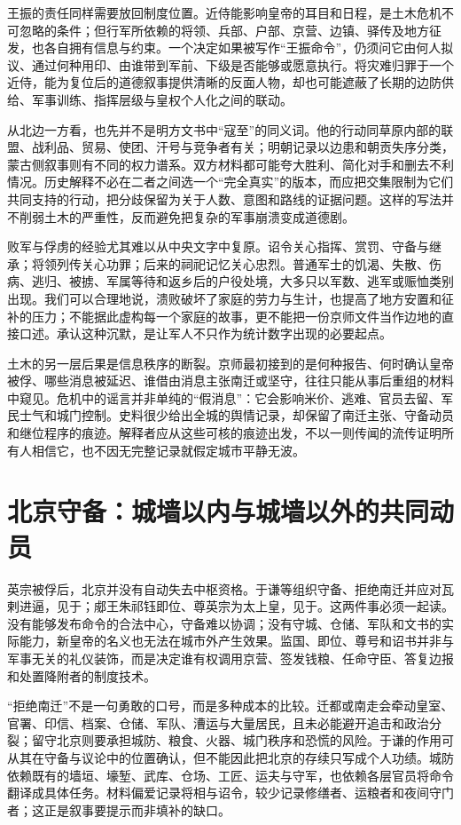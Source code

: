 王振的责任同样需要放回制度位置。近侍能影响皇帝的耳目和日程，是土木危机不可忽略的条件；但行军所依赖的将领、兵部、户部、京营、边镇、驿传及地方征发，也各自拥有信息与约束。一个决定如果被写作“王振命令”，仍须问它由何人拟议、通过何种用印、由谁带到军前、下级是否能够或愿意执行。将灾难归罪于一个近侍，能为复位后的道德叙事提供清晰的反面人物，却也可能遮蔽了长期的边防供给、军事训练、指挥层级与皇权个人化之间的联动。

从北边一方看，也先并不是明方文书中“寇至”的同义词。他的行动同草原内部的联盟、战利品、贸易、使团、汗号与竞争者有关；明朝记录以边患和朝贡失序分类，蒙古侧叙事则有不同的权力谱系。双方材料都可能夸大胜利、简化对手和删去不利情况。历史解释不必在二者之间选一个“完全真实”的版本，而应把交集限制为它们共同支持的行动，把分歧保留为关于人数、意图和路线的证据问题。这样的写法并不削弱土木的严重性，反而避免把复杂的军事崩溃变成道德剧。

败军与俘虏的经验尤其难以从中央文字中复原。诏令关心指挥、赏罚、守备与继承；将领列传关心功罪；后来的祠祀记忆关心忠烈。普通军士的饥渴、失散、伤病、逃归、被掳、军属等待和返乡后的户役处境，大多只以军数、逃军或赈恤类别出现。我们可以合理地说，溃败破坏了家庭的劳力与生计，也提高了地方安置和征补的压力；不能据此虚构每一个家庭的故事，更不能把一份京师文件当作边地的直接口述。承认这种沉默，是让军人不只作为统计数字出现的必要起点。

土木的另一层后果是信息秩序的断裂。京师最初接到的是何种报告、何时确认皇帝被俘、哪些消息被延迟、谁借由消息主张南迁或坚守，往往只能从事后重组的材料中窥见。危机中的谣言并非单纯的“假消息”：它会影响米价、逃难、官员去留、军民士气和城门控制。史料很少给出全城的舆情记录，却保留了南迁主张、守备动员和继位程序的痕迹。解释者应从这些可核的痕迹出发，不以一则传闻的流传证明所有人相信它，也不因无完整记录就假定城市平静无波。

\section{北京守备：城墙以内与城墙以外的共同动员}

英宗被俘后，北京并没有自动失去中枢资格。于谦等组织守备、拒绝南迁并应对瓦剌进逼，见于；郕王朱祁钰即位、尊英宗为太上皇，见于。这两件事必须一起读。没有能够发布命令的合法中心，守备难以协调；没有守城、仓储、军队和文书的实际能力，新皇帝的名义也无法在城市外产生效果。监国、即位、尊号和诏书并非与军事无关的礼仪装饰，而是决定谁有权调用京营、签发钱粮、任命守臣、答复边报和处置降附者的制度技术。

“拒绝南迁”不是一句勇敢的口号，而是多种成本的比较。迁都或南走会牵动皇室、官署、印信、档案、仓储、军队、漕运与大量居民，且未必能避开追击和政治分裂；留守北京则要承担城防、粮食、火器、城门秩序和恐慌的风险。于谦的作用可从其在守备与议论中的位置确认，但不能因此把北京的存续只写成个人功绩。城防依赖既有的墙垣、壕堑、武库、仓场、工匠、运夫与守军，也依赖各层官员将命令翻译成具体任务。材料偏爱记录将相与诏令，较少记录修缮者、运粮者和夜间守门者；这正是叙事要提示而非填补的缺口。

